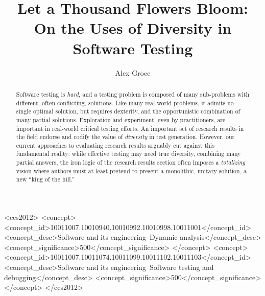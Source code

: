 \documentclass[sigplan,screen]{acmart}
\begin{document}
\title{Let a Thousand Flowers Bloom: On the Uses of Diversity in Software Testing}

\author{Alex Groce}


\renewcommand{\shortauthors}{Alex Groce}

\begin{abstract}
Software testing is \emph{hard}, and a testing problem is composed of
many sub-problems with different, often conflicting, solutions.  Like many real-world problems, it
admits no single optimal solution, but requires dexterity, and the
opportunistic combination of many partial solutions.  Exploration and
experiment, even by practitioners, are important in real-world
critical testing efforts.  An important set of research results in the
field endorse and codify the value of \emph{diversity} in test generation.
However, our current approaches to evaluating research results
arguably cut against this fundamental reality: while effective testing
may need true diversity, combining many partial answers, the iron
logic of the research results section often imposes a
\emph{totalizing} vision where authors must at least pretend to
present a monolithic, unitary solution, a new ``king of the hill.''
\end{abstract}

\begin{CCSXML}
<ccs2012>
<concept>
<concept_id>10011007.10010940.10010992.10010998.10011001</concept_id>
<concept_desc>Software and its engineering~Dynamic analysis</concept_desc>
<concept_significance>500</concept_significance>
</concept>
<concept>
<concept_id>10011007.10011074.10011099.10011102.10011103</concept_id>
<concept_desc>Software and its engineering~Software testing and debugging</concept_desc>
<concept_significance>500</concept_significance>
</concept>
</ccs2012>
\end{CCSXML}
\end{document}
